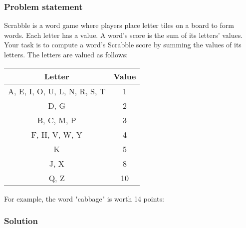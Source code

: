 \documentclass{report}
\begin{document}
    \subsubsection{Problem statement}
    \bigbreak \noindent 
    Scrabble is a word game where players place letter tiles on a board to form words. Each letter has a value. A word's score is the sum of its letters' values.
    \bigbreak \noindent 
    Your task is to compute a word's Scrabble score by summing the values of its letters.
    \bigbreak \noindent 
    The letters are valued as follows:
    \bigbreak \noindent 
    \begin{center}
        \begin{tabular}{c|c}
            Letter	&Value \\
            \hline
            A, E, I, O, U, L, N, R, S, T	&1 \\
            D, G	&2 \\
            B, C, M, P	&3 \\
            F, H, V, W, Y	&4 \\
            K	&5 \\
            J, X	&8 \\
            Q, Z	&10
        \end{tabular}
    \end{center}
    \bigbreak \noindent 
    For example, the word "cabbage" is worth 14 points:
    \bigbreak \noindent 
    \subsubsection{Solution}
    \bigbreak \noindent 
\end{document}
